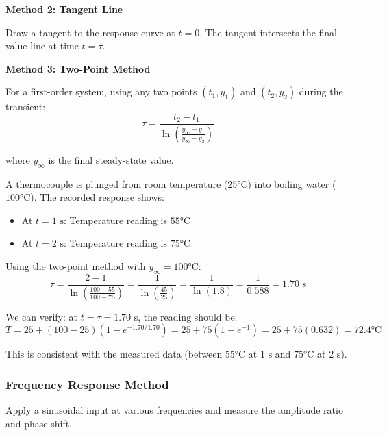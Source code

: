 \textbf{Method 2: Tangent Line}

Draw a tangent to the response curve at $t = 0$. The tangent intersects the final value line at time $t = \tau$.

\textbf{Method 3: Two-Point Method}

For a first-order system, using any two points $(t_1, y_1)$ and $(t_2, y_2)$ during the transient:
\begin{equation}
\tau = \frac{t_2 - t_1}{\ln\left(\frac{y_{\infty} - y_1}{y_{\infty} - y_2}\right)}
\label{eq:two_point_tau}
\end{equation}

where $y_{\infty}$ is the final steady-state value.

\begin{example}
\label{ex:identify_tau}

A thermocouple is plunged from room temperature ($25°\text{C}$) into boiling water ($100°\text{C}$). The recorded response shows:
\begin{itemize}
    \item At $t = 1\text{ s}$: Temperature reading is $55°\text{C}$
    \item At $t = 2\text{ s}$: Temperature reading is $75°\text{C}$
\end{itemize}

Using the two-point method with $y_{\infty} = 100°\text{C}$:
\begin{equation}
\tau = \frac{2 - 1}{\ln\left(\frac{100 - 55}{100 - 75}\right)} = \frac{1}{\ln\left(\frac{45}{25}\right)} = \frac{1}{\ln(1.8)} = \frac{1}{0.588} = 1.70\text{ s}
\end{equation}

We can verify: at $t = \tau = 1.70\text{ s}$, the reading should be:
\begin{equation}
T = 25 + (100-25)(1 - e^{-1.70/1.70}) = 25 + 75(1 - e^{-1}) = 25 + 75(0.632) = 72.4°\text{C}
\end{equation}

This is consistent with the measured data (between $55°\text{C}$ at $1\text{ s}$ and $75°\text{C}$ at $2\text{ s}$).
\end{example}

\subsubsection{Frequency Response Method}

Apply a sinusoidal input at various frequencies and measure the amplitude ratio and phase shift.

